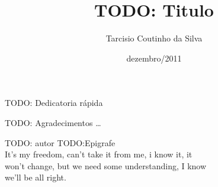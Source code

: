 \documentclass[pt,bsc,oneside,onehalfspacing]{risethesis}
\title{TODO: Titulo}
\date{dezembro/2011}
\author{Tarcisio Coutinho da Silva}
\begin{document}
\frontmatter
\frontpage
\presentationpage

\begin{dedicatory}
TODO: Dedicatoria rápida
\end{dedicatory}

\acknowledgements
TODO: Agradecimentos
\ldots

\begin{epigraph}{TODO: autor}
TODO:Epigrafe\\
\vspace{0.5cm}
It's my freedom, can't take it from me, i know it, it\\
won't change, but we need some understanding, I know\\
we'll be all right.
\end{epigraph}

\resumo


\abstract



\tableofcontents
\listoffigures
\listoftables


\mainmatter








\clearpage
\addappheadtotoc
\appendix
\appendixpage

\end{document}
